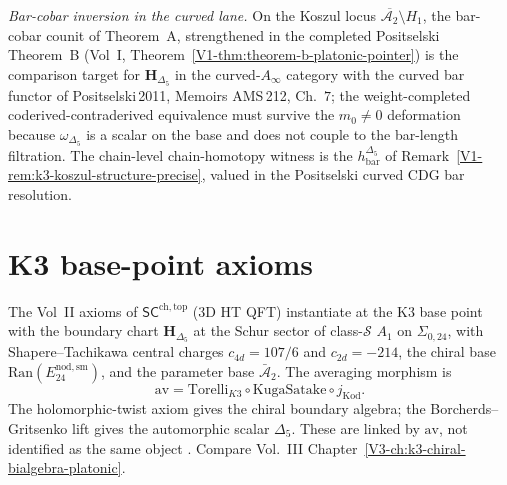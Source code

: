 \begin{remark}
\smallskip
\noindent\emph{Bar-cobar inversion in the curved lane.}
On the Koszul locus $\overline{\mathcal{A}_2}\setminus H_1$, the
bar-cobar counit of Theorem~A, strengthened in the completed
Positselski Theorem~B \textup{(}Vol~I,
Theorem~\textup{\ref{V1-thm:theorem-b-platonic-pointer}}\textup{)}
is the comparison target for $\mathbf{H}_{\Delta_5}$ in the
curved-$A_\infty$ category with the curved bar functor of
Positselski\,2011, Memoirs AMS\,212, Ch.~$7$; the
weight-completed coderived-contraderived equivalence must survive the
$m_0\ne 0$ deformation because
$\omega_{\Delta_5}$ is a scalar on the base and does not couple to
the bar-length filtration. The chain-level chain-homotopy witness
is the $h_{\mathrm{bar}}^{\Delta_5}$ of
Remark~\textup{\ref{V1-rem:k3-koszul-structure-precise}}, valued in the
Positselski curved CDG bar resolution.
\end{remark}

\section{K3 base-point axioms}
\label{sec:axioms-supplement}

\begin{remark}
\label{rem:axioms-1}
The Vol~II axioms of $\mathsf{SC}^{\mathrm{ch,top}}$ ($3$D HT QFT)
instantiate at the K3 base point with the boundary chart
$\mathbf H_{\Delta_5}$ at the Schur sector of class-$\mathcal S$ $A_1$
on $\Sigma_{0,24}$, with Shapere--Tachikawa central charges
$c_{4d} = 107/6$ and $c_{2d} = -214$,
the chiral base $\mathrm{Ran}(E^{\mathrm{nod,sm}}_{24})$, and the
parameter base $\bar{\mathcal A}_2$. The averaging morphism is
\[
\mathrm{av}
=\mathrm{Torelli}_{K3}\circ\mathrm{KugaSatake}\circ j_{\mathrm{Kod}}.
\]
The holomorphic-twist axiom gives the chiral boundary algebra; the
Borcherds--Gritsenko lift gives the automorphic scalar
$\Delta_5$. These are linked by $\mathrm{av}$, not identified as
the same object \cite{CostelloHolomorphic,Gaiotto2009}.
Compare Vol.~III Chapter~\ref{V3-ch:k3-chiral-bialgebra-platonic}.
\end{remark}

